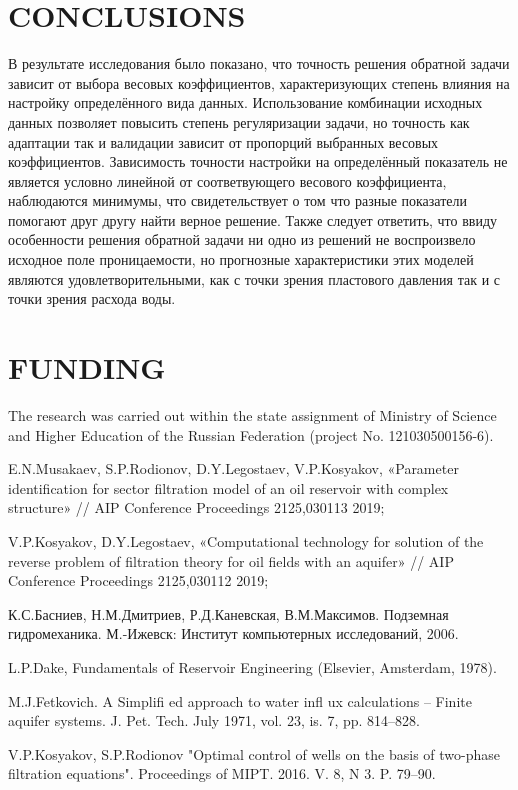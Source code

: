 \documentclass{article}
\begin{document}
\section{CONCLUSIONS}

В результате исследования было показано, что точность решения обратной задачи зависит от выбора весовых коэффициентов, характеризующих степень влияния на настройку определённого вида данных. Использование комбинации исходных данных позволяет повысить степень регуляризации задачи, но точность как адаптации так и валидации зависит от пропорций выбранных весовых коэффициентов. Зависимость точности настройки на определённый показатель не является условно линейной от соответвующего весового коэффициента, наблюдаются минимумы, что свидетельствует о том что разные показатели помогают друг другу найти верное решение. Также следует ответить, что ввиду особенности решения обратной задачи ни одно из решений не воспроизвело исходное поле проницаемости, но прогнозные характеристики этих моделей являются удовлетворительными, как с точки зрения пластового давления так и с точки зрения расхода воды.


\section{FUNDING}
The research was carried out within the state assignment of Ministry of Science and Higher Education of the Russian Federation (project No. 121030500156-6).

%
%
\begin{thebibliography}{99}
 E.N.Musakaev, S.P.Rodionov, D.Y.Legostaev, V.P.Kosyakov,  «Parameter identification for sector filtration model of an oil reservoir with complex structure» // AIP Conference Proceedings 2125,030113 2019;

 V.P.Kosyakov, D.Y.Legostaev,  «Computational technology for solution of the reverse problem of filtration theory for oil fields with an aquifer» // AIP Conference Proceedings 2125,030112 2019;

 К.С.Басниев, Н.М.Дмитриев, Р.Д.Каневская, В.М.Максимов. Подземная гидромеханика.  М.-Ижевск: Институт компьютерных исследований, 2006. 

 L.P.Dake, Fundamentals of Reservoir Engineering (Elsevier, Amsterdam, 1978).

 M.J.Fetkovich. A Simplifi ed approach to water infl ux calculations – Finite aquifer systems. J. Pet. Tech. July 1971, vol. 23, is. 7, pp. 814–828.

 V.P.Kosyakov, S.P.Rodionov "Optimal control of wells on the basis of two-phase filtration equations". Proceedings of MIPT. 2016. V. 8, N 3. P. 79–90.


\end{thebibliography}
\end{document}
